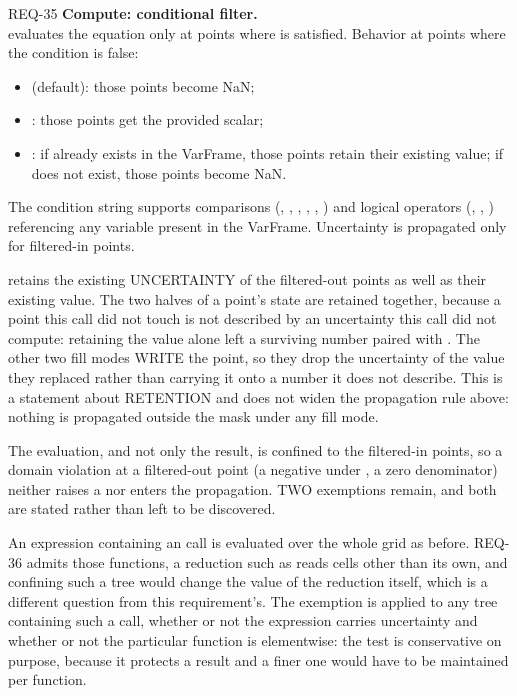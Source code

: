 \begin{reqbox}{REQ-35}{\stable}
\textbf{Compute: conditional filter.}\\
 evaluates
the equation only at points where  is satisfied. Behavior
at points where the condition is false:
\begin{itemize}[noitemsep,topsep=2pt]
  \item {} (default): those points become NaN;
  \item {}: those points get the provided scalar;
  \item {}: if  already exists in the
    VarFrame, those points retain their existing value; if 
    does not exist, those points become NaN.
\end{itemize}
The condition string supports comparisons (\code{>}, \code{<}, \code{>=},
\code{<=}, \code{==}, \code{!=}) and logical operators (,
, ) referencing any variable present in the VarFrame.
Uncertainty is propagated only for filtered-in points.

 retains the existing UNCERTAINTY of the filtered-out
points as well as their existing value. The two halves of a point's
state are retained together, because a point this call did not touch is
not described by an uncertainty this call did not compute: retaining the
value alone left a surviving number paired with . The
other two fill modes WRITE the point, so they drop the uncertainty of
the value they replaced rather than carrying it onto a number it does
not describe. This is a statement about RETENTION and does not widen the
propagation rule above: nothing is propagated outside the mask under any
fill mode.

The evaluation, and not only the result, is confined to the filtered-in
points, so a domain violation at a filtered-out point (a negative under
, a zero denominator) neither raises a 
nor enters the propagation. TWO exemptions remain, and both are stated
rather than left to be discovered.

An expression containing an  call is evaluated over the whole
grid as before. REQ-36 admits those functions, a reduction such as
 reads cells other than its own, and confining such a tree
would change the value of the reduction itself, which is a different
question from this requirement's. The exemption is applied to any tree
containing such a call, whether or not the expression carries
uncertainty and whether or not the particular function is elementwise:
the test is conservative on purpose, because it protects a result and a
finer one would have to be maintained per function.


\end{reqbox}
